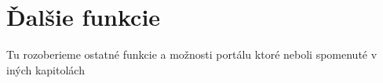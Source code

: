 \chapter{Ďalšie funkcie}

\label{kap:features}

Tu rozoberieme ostatné funkcie a možnosti portálu ktoré neboli spomenuté v iných kapitolách	